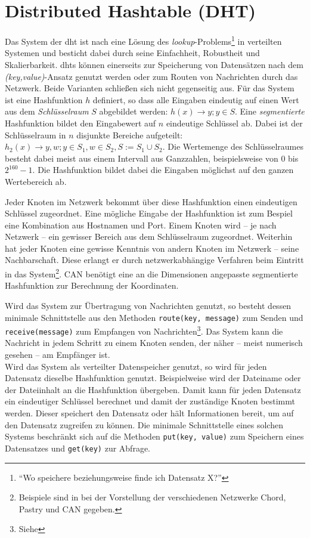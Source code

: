\chapter{Distributed Hashtable (DHT)}
\label{chap:dht}

Das System der \acf{dht} ist nach \cite{Wehrle2005} eine Lösung des \emph{lookup}-Problems\footnote{\enquote{Wo speichere beziehungsweise finde ich Datensatz X?}} in verteilten Systemen und besticht dabei durch seine Einfachheit, Robustheit und Skalierbarkeit. \acp{dht} können einerseits zur Speicherung von Datensätzen nach dem \emph{(key,value)}-Ansatz genutzt werden oder zum Routen von Nachrichten durch das Netzwerk. Beide Varianten schließen sich nicht gegenseitig aus. Für das System ist eine Hashfunktion $h$ definiert, so dass alle Eingaben eindeutig auf einen Wert aus dem \emph{Schlüsselraum} $S$ abgebildet werden: $h(x) \rightarrow y; y \in S$. Eine \emph{segmentierte} Hashfunktion bildet den Eingabewert auf $n$ eindeutige Schlüssel ab. Dabei ist der Schlüsselraum in $n$ disjunkte Bereiche aufgeteilt: $h_2(x) \rightarrow y,w; y \in S_1, w \in S_2, S := S_1 \cup S_2$. Die Wertemenge des Schlüsselraumes besteht dabei meist aus einem Intervall aus Ganzzahlen, beispielsweise von $0$ bis $2^{160}-1$. Die Hashfunktion bildet dabei die Eingaben möglichst auf den ganzen Wertebereich ab.

Jeder Knoten im Netzwerk bekommt über diese Hashfunktion einen eindeutigen Schlüssel zugeordnet. Eine mögliche Eingabe der Hashfunktion ist zum Bespiel eine Kombination aus Hostnamen und Port. Einem Knoten wird -- je nach Netzwerk -- ein gewisser Bereich aus dem Schlüsselraum zugeordnet. Weiterhin hat jeder Knoten eine gewisse Kenntnis von andern Knoten im Netzwerk -- seine Nachbarschaft. Diese erlangt er durch netzwerkabhängige Verfahren beim Eintritt in das System\footnote{Beispiele sind in  bei der Vorstellung der verschiedenen Netzwerke Chord, Pastry und CAN gegeben.}. CAN benötigt eine an die Dimensionen angepasste segmentierte Hashfunktion zur Berechnung der Koordinaten.

Wird das System zur Übertragung von Nachrichten genutzt, so besteht dessen minimale Schnittstelle aus den Methoden \texttt{route(key, message)} zum Senden und \texttt{receive(message)} zum Empfangen von Nachrichten\footnote{Siehe }. Das System kann die Nachricht in jedem Schritt zu einem Knoten senden, der näher -- meist numerisch gesehen -- am Empfänger ist.\\
Wird das System als verteilter Datenspeicher genutzt, so wird für jeden Datensatz dieselbe Hashfunktion genutzt. Beispielweise wird der Dateiname oder der Dateiinhalt an die Hashfunktion übergeben. Damit kann für jeden Datensatz ein eindeutiger Schlüssel berechnet und damit der zuständige Knoten bestimmt werden. Dieser speichert den Datensatz oder hält Informationen bereit, um auf den Datensatz zugreifen zu können. Die minimale Schnittstelle eines solchen Systems beschränkt sich auf die Methoden \texttt{put(key, value)} zum Speichern eines Datensatzes und \texttt{get(key)} zur Abfrage.

